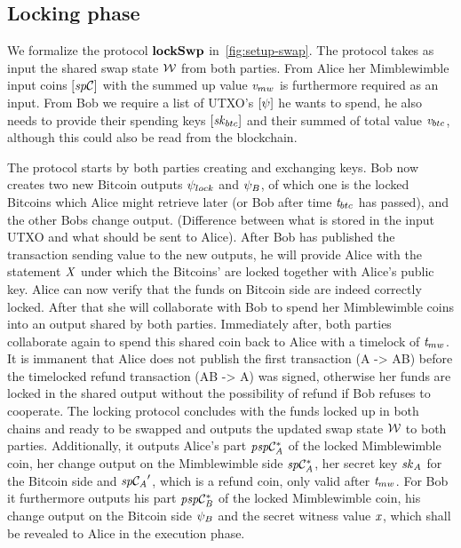 \subsection{Locking phase}\label{subsec:atom:locking}

We formalize the protocol $\mathbf{lockSwp}$ in~\cref{fig:setup-swap}.
The protocol takes as input the shared swap state $\mathcal{W}$ from both parties.
From Alice her Mimblewimble input coins $[\mathit{sp}\mathcal{C}]$ with the summed up value $\mathit{v}_{mw}$ is furthermore required as an input.
From Bob we require a list of UTXO's $[\psi]$ he wants to spend, he also needs to provide their spending keys $[\mathit{sk}_{btc}]$ and their summed of total value $\mathit{v}_{btc}$, although this could also be read from the blockchain.

The protocol starts by both parties creating and exchanging keys.
Bob now creates two new Bitcoin outputs $\psi_{lock}$ and $\psi_{B}$, of which one is the locked Bitcoins which Alice might retrieve later (or Bob after time $\mathit{t}_{btc}$ has passed), and the other Bobs change output. (Difference between what is stored in the input UTXO and what should be sent to Alice).
After Bob has published the transaction sending value to the new outputs, he will provide Alice with the statement $\mathit{X}$ under which the Bitcoins' are locked together with Alice's public key.
Alice can now verify that the funds on Bitcoin side are indeed correctly locked.
After that she will collaborate with Bob to spend her Mimblewimble coins into an output shared by both parties.
Immediately after, both parties collaborate again to spend this shared coin back to Alice with a timelock of $\mathit{t}_{mw}$.
It is immanent that Alice does not publish the first transaction (A -> AB) before the timelocked refund transaction (AB -> A) was signed, otherwise her funds are locked in the shared output without the possibility of refund if Bob refuses to cooperate.
The locking protocol concludes with the funds locked up in both chains and ready to be swapped and outputs the updated swap state $\mathcal{W}$ to both parties.
Additionally, it outputs Alice's part $\mathit{psp}\mathcal{C}_{\mathit{A}}^*$ of the locked Mimblewimble coin, her change output on the Mimblewimble side $\mathit{sp}\mathcal{C}_{\mathit{A}}^*$, her secret key $\mathit{sk}_{\mathit{A}}$ for the Bitcoin side and ${\mathit{sp}\mathcal{C}_{\mathit{A}}}'$, which is a refund coin, only valid after $\mathit{t}_{mw}$.
For Bob it furthermore outputs his part $\mathit{psp}\mathcal{C}_{\mathit{B}}^*$ of the locked Mimblewimble coin, his change output on the Bitcoin side $\psi_{B}$ and the secret witness value $\mathit{x}$, which shall be revealed to Alice in the execution phase.

